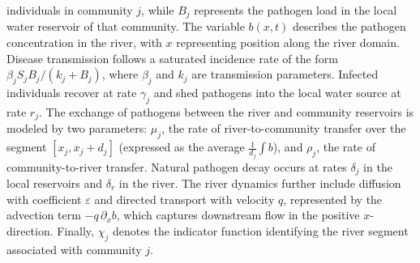 \documentclass[a4paper,11pt]{amsart}
\theoremstyle{definition}
\numberwithin{equation}{section}
\theoremstyle{definition}
\begin{document}
individuals in community $j$, while $B_j$ represents the pathogen load in the
local water reservoir of that community. The variable $b(x,t)$ describes the
pathogen concentration in the river, with $x$ representing position along the
river domain. Disease transmission follows a saturated incidence rate of the
form $\beta_j S_j B_j /(k_j + B_j)$, where $\beta_j$ and $k_j$ are transmission
parameters. Infected individuals recover at rate $\gamma_j$ and shed pathogens
into the local water source at rate $r_j$. The exchange of pathogens between
the river and community reservoirs is modeled by two parameters: $\mu_j$, the
rate of river-to-community transfer over the segment $[x_j, x_j+d_j]$ (expressed
as the average $\tfrac{1}{d_j}\int b$), and $\rho_j$, the rate of
community-to-river transfer. Natural pathogen decay occurs at rates $\delta_j$
in the local reservoirs and $\delta_r$ in the river. The river dynamics further
include diffusion with coefficient $\varepsilon$ and directed transport with
velocity $q$, represented by the advection term $-q\,\partial_x b$, which
captures downstream flow in the positive $x$-direction. Finally, $\chi_j$
denotes the indicator function identifying the river segment associated with
community $j$.
\end{document}
